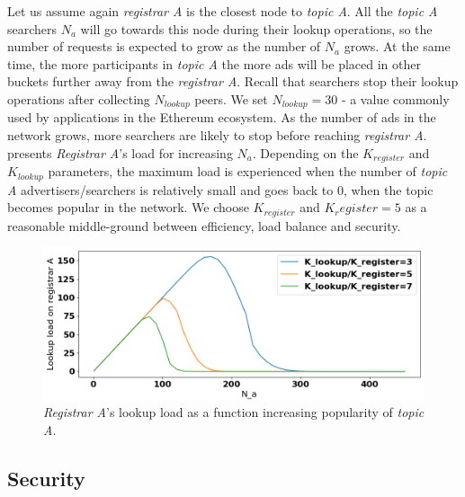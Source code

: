 Let us assume again \emph{registrar A} is the closest node to \emph{topic A}. All the \emph{topic A} searchers $N_a$ will go towards this node during their lookup operations, so the number of requests is expected to grow as the number of $N_a$ grows. At the same time, the more participants in \emph{topic A} the more ads will be placed in other buckets further away from the \emph{registrar A}. Recall that searchers stop their lookup operations after collecting $N_{lookup}$ peers. We set $N_{lookup} = 30$ - a value commonly used by applications in the Ethereum ecosystem. As the number of ads in the network grows, more searchers are likely to stop before reaching \emph{registrar A}.  presents \emph{Registrar A}'s load for increasing $N_a$. Depending on the $K_{register}$ and $K_{lookup}$ parameters, the maximum load is experienced when the number of \emph{topic A} advertisers/searchers is relatively small and goes back to $0$, when the topic becomes popular in the network. We choose $K_{register}$ and $K_register =5$ as a reasonable middle-ground between efficiency, load balance and security.

\begin{figure}[t]
    \includegraphics[width=1\linewidth]{img/fairness_lookup}
    \vspace{-0.05in}
    \caption{\emph{Registrar A}'s lookup load as a function increasing popularity of \emph{topic A}.
    }
    \label{fig:fairness_lookup}
    \vspace{-0.15in}
\end{figure}

\subsection{Security}

